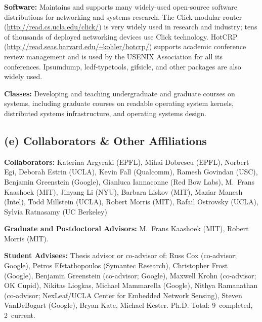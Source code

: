 \documentclass[11pt]{article}
\begin{document}
\textbf{Software:} Maintains and supports many widely-used open-source
software distributions for networking and systems research. The Click
modular router (\url{http://read.cs.ucla.edu/click/}) is very widely
used in research and industry; tens of thousands of deployed networking
devices use Click technology. HotCRP
(\url{http://read.seas.harvard.edu/~kohler/hotcrp/}) supports academic
conference review management and is used by the USENIX Association for
all its conferences. Ipsumdump, lcdf-typetools, gifsicle, and other
packages are also widely used.

\textbf{Classes:} Developing and teaching undergraduate and graduate
courses on systems, including graduate courses on readable operating
system kernels, distributed systems infrastructure, and operating
systems design.

\subsection*{(e) Collaborators \& Other Affiliations} 

\noindent\textbf{Collaborators:} 
Katerina Argyraki (EPFL),
Mihai Dobrescu (EPFL),
Norbert Egi,
Deborah Estrin (UCLA),
Kevin Fall (Qualcomm),
Ramesh Govindan (USC),
Benjamin Greenstein (Google),
Gianluca Iannaconne (Red Bow Labs),
M.~Frans Kaashoek (MIT),
Jinyang Li (NYU),
Barbara Liskov (MIT),
Maziar Manesh (Intel),
Todd Millstein (UCLA),
Robert Morris (MIT),
Rafail Ostrovsky (UCLA),
Sylvia Ratnasamy (UC Berkeley)

\textbf{Graduate and Postdoctoral Advisors:}
M.~Frans Kaashoek (MIT),
Robert Morris (MIT).

\textbf{Student Advisees:}
Thesis advisor or co-advisor of:
Russ Cox (co-advisor; Google),
Petros Efstathopoulos (Symantec Research),
Christopher Frost (Google),
Benjamin Greenstein (co-advisor; Google),
Maxwell Krohn (co-advisor; OK Cupid),
Nikitas Liogkas,
Michael Mammarella (Google),
Nithya Ramanathan (co-advisor; NexLeaf/UCLA Center for Embedded Network Sensing),
Steven VanDeBogart (Google),
Bryan Kate,
Michael Kester.
Ph.D. Total: 9~completed, 2~current.
\end{document}
